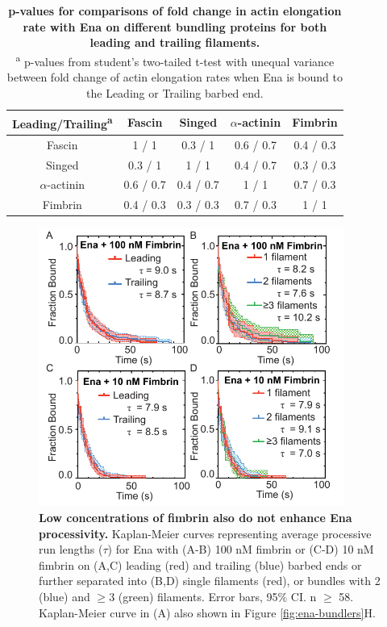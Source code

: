 \begin{table}[!htb]
\centering
\begin{tabular}{ c c c c c }
\toprule 
Leading\slash Trailing\textsuperscript{a} & Fascin & Singed & $\alpha$-actinin & Fimbrin \\
\midrule
Fascin & 1 / 1 & 0.3 / 1 & 0.6 / 0.7 & 0.4 / 0.3 \\
Singed & 0.3 / 1 & 1 / 1 & 0.4 / 0.7 & 0.3 / 0.3 \\
$\alpha$-actinin & 0.6 / 0.7 & 0.4 / 0.7 & 1 / 1 & 0.7 / 0.3 \\
Fimbrin & 0.4 / 0.3 & 0.3 / 0.3 & 0.7 / 0.3 & 1 / 1 \\
\bottomrule
\end{tabular}
\caption[p-values for comparisons of fold change in actin elongation rate with Ena on different bundling proteins for both leading and trailing filaments.]{\textbf{p-values for comparisons of fold change in actin elongation rate with Ena on different bundling proteins for both leading and trailing filaments.} \\
\textsuperscript{a} p-values from student's two-tailed t-test with unequal variance between fold change of actin elongation rates when Ena is bound to the Leading or Trailing barbed end.}
\label{tab:ena-p-elongation-bundlers}
\end{table}

\begin{figure}[ht]
\centering
\includegraphics[width=10cm]{img/ch02/low_fimbrin.pdf}
\caption[Low concentrations of fimbrin also do not enhance Ena processivity.]{\textbf{Low concentrations of fimbrin also do not enhance Ena processivity.} Kaplan-Meier curves representing average processive run lengths ($\tau$) for Ena with (A-B) 100 nM fimbrin or (C-D) 10 nM fimbrin on (A,C) leading (red) and trailing (blue) barbed ends or further separated into (B,D) single filaments (red), or bundles with 2 (blue) and $\geq$3 (green) filaments. Error bars, 95\% CI. n $\geq$ 58.  Kaplan-Meier curve in (A) also shown in Figure \ref{fig:ena-bundlers}H.}
\label{fig:ena-low-fim}
\end{figure}

